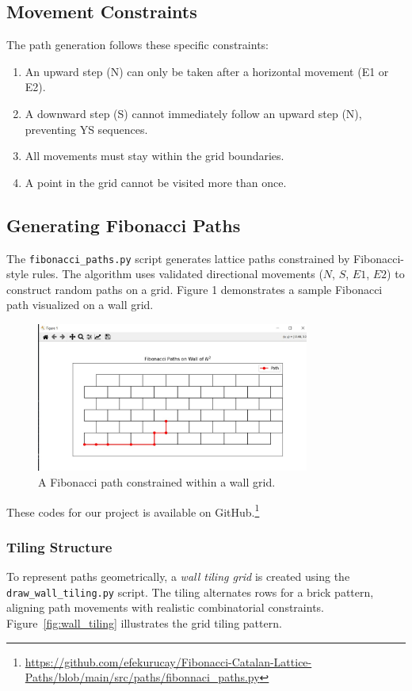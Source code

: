 \documentclass{article}
\begin{document}
\subsection{Movement Constraints}
The path generation follows these specific constraints:
\begin{enumerate}
    \item An upward step (N) can only be taken after a horizontal movement (E1 or E2).
    \item A downward step (S) cannot immediately follow an upward step (N), preventing YS sequences.
    \item All movements must stay within the grid boundaries.
    \item A point in the grid cannot be visited more than once.
\end{enumerate}

\subsection{Generating Fibonacci Paths}
The \texttt{fibonacci\_paths.py} script generates lattice paths constrained by Fibonacci-style rules. The algorithm uses validated directional movements ($N$, $S$, $E1$, $E2$) to construct random paths on a grid. Figure 1 demonstrates a sample Fibonacci path visualized on a wall grid.

\begin{figure}[h]
    \centering
    \includegraphics[width=0.8\textwidth]{images/fibonacci.jpg}
    \caption{A Fibonacci path constrained within a wall grid.}
    \label{fig:fibonacci_path}
\end{figure}

These codes for our project is available on GitHub.\footnote{\url{https://github.com/efekurucay/Fibonacci-Catalan-Lattice-Paths/blob/main/src/paths/fibonnaci_paths.py}}

\subsubsection{Tiling Structure}
To represent paths geometrically, a \textit{wall tiling grid} is created using the \texttt{draw\_wall\_tiling.py} script. The tiling alternates rows for a brick pattern, aligning path movements with realistic combinatorial constraints. Figure~\ref{fig:wall_tiling} illustrates the grid tiling pattern.
\end{document}
